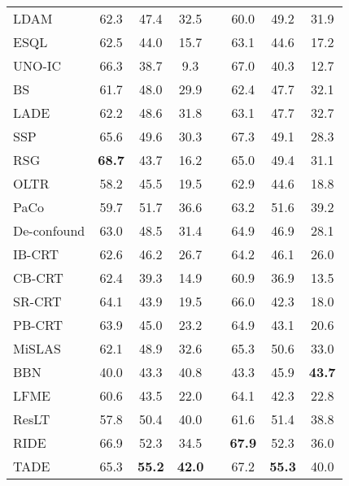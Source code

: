 \begin{table*}[!t]
\begin{minipage}[t]{0.48\textwidth}
{\begin{tabular}{lccccccc}
LDAM \cite{cao2019learning}  & 62.3  & 47.4  & 32.5  &       & 60.0  & 49.2  & 31.9  \\
ESQL \cite{Tan_2020}  & 62.5  & 44.0  & 15.7  &       & 63.1  & 44.6  & 17.2  \\
UNO-IC \cite{tian2020posterior}  & 66.3  & 38.7  & 9.3   &       & 67.0  & 40.3  & 12.7  \\
BS \cite{ren2020balanced}   & 61.7  & 48.0  & 29.9  &       & 62.4  & 47.7  & 32.1  \\
LADE \cite{Hong_2021}  & 62.2  & 48.6  & 31.8  &       & 63.1  & 47.7  & 32.7  \\
\midrule
SSP \cite{yang2020rethinking} & 65.6  & 49.6  & 30.3  &       & 67.3  & 49.1  & 28.3  \\
RSG \cite{Wang_2021_rsg}  & \textbf{68.7} & 43.7  & 16.2  &       & 65.0  & 49.4  & 31.1  \\
\midrule
OLTR \cite{Liu_2019}  & 58.2  & 45.5  & 19.5  &       & 62.9  & 44.6  & 18.8  \\
PaCo \cite{Cui_2021}  & 59.7  & 51.7  & 36.6  &       & 63.2  & 51.6  & 39.2  \\
De-confound \cite{tang2020long}  & 63.0  & 48.5  & 31.4  &       & 64.9  & 46.9  & 28.1  \\
\midrule
IB-CRT \cite{kang2019decoupling}  & 62.6  & 46.2  & 26.7  &       & 64.2  & 46.1  & 26.0  \\
CB-CRT \cite{kang2019decoupling} & 62.4  & 39.3  & 14.9  &       & 60.9  & 36.9  & 13.5  \\
SR-CRT \cite{kang2019decoupling}  & 64.1  & 43.9  & 19.5  &       & 66.0  & 42.3  & 18.0  \\
PB-CRT \cite{kang2019decoupling}  & 63.9  & 45.0  & 23.2  &       & 64.9  & 43.1  & 20.6  \\
MiSLAS \cite{Zhong_2021}  & 62.1  & 48.9  & 32.6  &       & 65.3  & 50.6  & 33.0  \\
\midrule
BBN \cite{Zhou_2020}  & 40.0  & 43.3  & 40.8  &       & 43.3  & 45.9  & \textbf{43.7} \\
LFME \cite{Xiang_2020}  & 60.6  & 43.5  & 22.0  &       & 64.1  & 42.3  & 22.8  \\
ResLT \cite{Cui_2022}  & 57.8  & 50.4  & 40.0  &       & 61.6  & 51.4  & 38.8  \\
RIDE \cite{wang2020long}  & 66.9  & 52.3  & 34.5  &       & \textbf{67.9} & 52.3  & 36.0  \\
TADE \cite{zhang2021test} & 65.3  & \textbf{55.2} & \textbf{42.0} &       & 67.2  & \textbf{55.3} & 40.0  \\
\bottomrule
\end{tabular}}%
\label{tab:6}%
\end{minipage}

\end{table*}